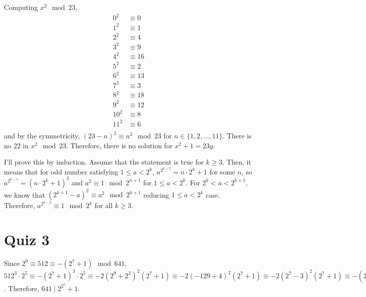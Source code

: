 \documentclass[12pt]{article}
\newenvironment{problem}[2][Problem]{\begin{trivlist}
\item[\hskip \labelsep {\bfseries #1}\hskip \labelsep {\bfseries #2.}]}{\end{trivlist}}
\begin{document}
\begin{problem}{7}
\end{problem}
Computing $x^2 \mod 23$,
\begin{equation*}
\begin{split}
    0^2&\equiv0 \\
    1^2&\equiv1 \\
    2^2&\equiv4 \\
    3^2&\equiv9 \\
    4^2&\equiv16 \\
    5^2&\equiv2 \\
    6^2&\equiv13 \\
    7^2&\equiv3 \\
    8^2&\equiv18 \\
    9^2&\equiv12 \\
    10^2&\equiv8 \\
    11^2&\equiv6 \\
\end{split}
\end{equation*}
and by the symmetricity, $(23-n)^2\equiv n^2 \mod 23$ for $n\in\{1, 2,\ldots, 11\}$. There is no $22$ in $x^2 \mod 23$. Therefore, there is no solution for $x^2+1=23y$.


\newpage
\begin{problem}{8}
\end{problem}
I'll prove this by induction. Assume that the statement is true for $k\geq 3$. Then, it means that for odd number satisfying $1\leq a< 2^{k}$, $a^{2^{k-2}}=n\cdot 2^k+1$ for some $n$, so $a^{2^{k-1}}=(n\cdot 2^k+1)^2$ and $a^2\equiv 1 \mod 2^{n+1}$ for $1\leq a< 2^{k}$. For $2^k<a<2^{k+1}$, we know that $(2^{k+1}-a)^2\equiv a^2 \mod 2^{k+1}$ reducing $1\leq a< 2^{k}$ case. Therefore, $a^{2^{k-2}}\equiv 1 \mod 2^k$ for all $k\geq 3$.
\newpage
\section{Quiz 3}
\begin{problem}{1}
\end{problem}
Since $2^9\equiv 512\equiv -(2^7+1) \mod 641$, $512^3\cdot 2^5\equiv -(2^7+1)^3\cdot 2^5 \equiv -2(2^9+2^2)^2(2^7+1)\equiv -2(-129+4)^2(2^7+1)\equiv-2(2^7-3)^2(2^7+1)\equiv -(2^{15}-3\cdot 2^9+18)(2^7+1)\equiv -((-2^7-1)2^6+3(129)+18)(2^7+1)\equiv -( 2^4(2^7+1)+341)(2^7+1)\equiv -(2^2(-2^7-1)+357)(2^7+1)\equiv-(2^7+354)(2^7+1)\equiv -1 \mod 641 $. Therefore, $641\mid 2^{2^5}+1$.
\end{document}
